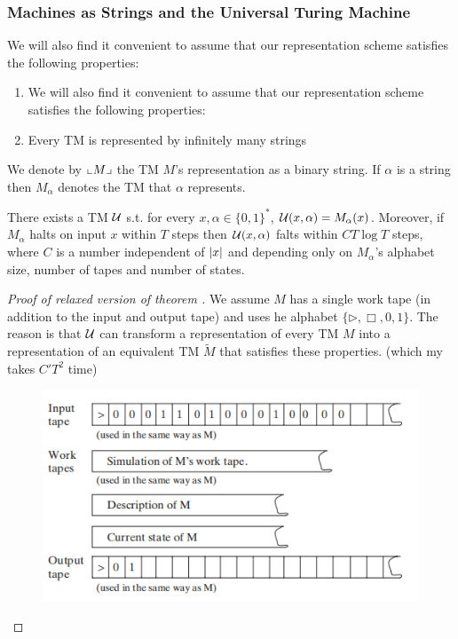 \documentclass[11pt]{article}
\begin{document}
\subsubsection{Machines as Strings and the Universal Turing Machine}
\label{sec:orgea18273}
We will also find it convenient to assume that our representation scheme satisfies the following
properties:
\begin{enumerate}
\item We will also find it convenient to assume that our representation scheme satisfies the
following properties:
\item Every TM is represented by infinitely many strings
\end{enumerate}

We denote by \(\llcorner M \lrcorner\) the TM \(M\)'s representation as a binary string. If \(\alpha\) is a string
then \(M_\alpha\) denotes the TM that \(\alpha\) represents.

\begin{theorem}
\label{thm1.9}
There exists a TM \(\mathcal{U}\) s.t. for
every \(x,\alpha\in\{0,1\}^*\), \(\mathcal{U}(x,\alpha)=M_\alpha(x)\). Moreover, if \(M_{\alpha}\) halts on
input \(x\) within \(T\) steps then \(\mathcal{U}(x,\alpha)\) falts within \(CT\log T\) steps, where \(C\)
is a number independent of \(\abs{x}\) and depending only on \(M_\alpha\)'s alphabet size,
number of tapes and number of states.
\end{theorem}

\begin{proof}[Proof of relaxed version of theorem \cite{thm1.9}]
We assume \(M\) has a single work tape (in addition to the input and output tape) and uses he
alphabet \(\{\rhd,\Box,0,1\}\). The reason is that \(\mathcal{U}\) can transform a representation of
every TM \(M\) into a representation of an equivalent TM \(\tilde{M}\) that satisfies these
properties. (which my takes \(C'T^2\) time)

\begin{figure}[htbp]
\centering
\includegraphics[width=.5\textwidth]{../images/ComputationalComplexity/3.png}
\end{figure}
\end{proof}
\end{document}
